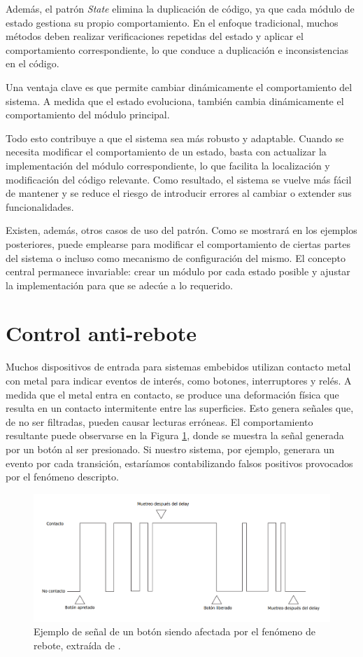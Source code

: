 Además, el patrón \textit{State} elimina la duplicación de código, ya que cada módulo de estado gestiona su propio comportamiento. En el enfoque tradicional, muchos métodos deben realizar verificaciones repetidas del estado y aplicar el comportamiento correspondiente, lo que conduce a duplicación e inconsistencias en el código.

Una ventaja clave es que permite cambiar dinámicamente el comportamiento del sistema. A medida que el estado evoluciona, también cambia dinámicamente el comportamiento del módulo principal.

Todo esto contribuye a que el sistema sea más robusto y adaptable. Cuando se necesita modificar el comportamiento de un estado, basta con actualizar la implementación del módulo correspondiente, lo que facilita la localización y modificación del código relevante. Como resultado, el sistema se vuelve más fácil de mantener y se reduce el riesgo de introducir errores al cambiar o extender sus funcionalidades.

Existen, además, otros casos de uso del patrón. Como se mostrará en los ejemplos posteriores, puede emplearse para modificar el comportamiento de ciertas partes del sistema o incluso como mecanismo de configuración del mismo. El concepto central permanece invariable: crear un módulo por cada estado posible y ajustar la implementación para que se adecúe a lo requerido.
\section{Control anti-rebote}
Muchos dispositivos de entrada para sistemas embebidos utilizan contacto metal con metal para indicar eventos de interés, como botones, interruptores y relés. A medida que el metal entra en contacto, se produce una deformación física que resulta en un contacto intermitente entre las superficies. Esto genera señales que, de no ser filtradas, pueden causar lecturas erróneas. El comportamiento resultante puede observarse en la Figura \ref{botonReboteD}, donde se muestra la señal generada por un botón al ser presionado. Si nuestro sistema, por ejemplo, generara un evento por cada transición, estaríamos contabilizando falsos positivos provocados por el fenómeno descripto.

\begin{figure}[H]
    \centering
    \includegraphics[width=0.9\linewidth]{antirebote.png}
    \caption{Ejemplo de señal de un botón siendo afectada por el fenómeno de rebote, extraída de \cite{douglass}.}
    \label{botonReboteD}
\end{figure}

